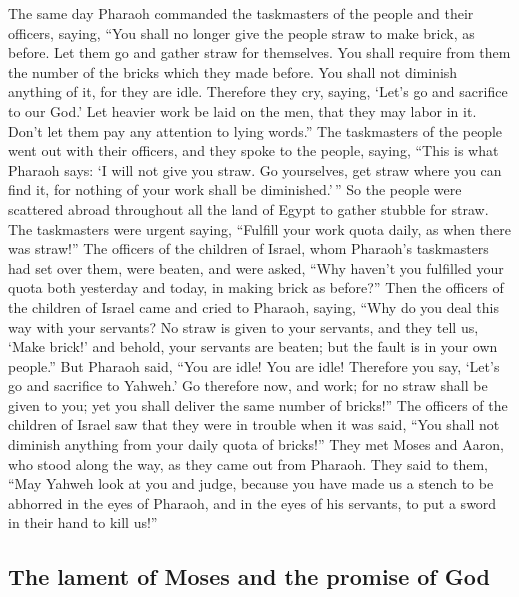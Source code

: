  The same day Pharaoh commanded the taskmasters of the
people and their officers, saying,  ``You shall no longer
give the people straw to make brick, as before. Let them go and gather
straw for themselves.  You shall require from them the
number of the bricks which they made before. You shall not diminish
anything of it, for they are idle. Therefore they cry, saying, `Let's go
and sacrifice to our God.'  Let heavier work be laid on
the men, that they may labor in it. Don't let them pay any attention to
lying words.''  The taskmasters of the people went out
with their officers, and they spoke to the people, saying, ``This is
what Pharaoh says: `I will not give you straw.  Go
yourselves, get straw where you can find it, for nothing of your work
shall be diminished.'\,''  So the people were scattered
abroad throughout all the land of Egypt to gather stubble for straw.
 The taskmasters were urgent saying, ``Fulfill your work
quota daily, as when there was straw!''  The officers of
the children of Israel, whom Pharaoh's taskmasters had set over them,
were beaten, and were asked, ``Why haven't you fulfilled your quota both
yesterday and today, in making brick as before?''  Then
the officers of the children of Israel came and cried to Pharaoh,
saying, ``Why do you deal this way with your servants? 
No straw is given to your servants, and they tell us, `Make brick!' and
behold, your servants are beaten; but the fault is in your own people.''
 But Pharaoh said, ``You are idle! You are idle!
Therefore you say, `Let's go and sacrifice to Yahweh.' 
Go therefore now, and work; for no straw shall be given to you; yet you
shall deliver the same number of bricks!''  The officers
of the children of Israel saw that they were in trouble when it was
said, ``You shall not diminish anything from your daily quota of
bricks!''  They met Moses and Aaron, who stood along the
way, as they came out from Pharaoh.  They said to them,
``May Yahweh look at you and judge, because you have made us a stench to
be abhorred in the eyes of Pharaoh, and in the eyes of his servants, to
put a sword in their hand to kill us!''

\hypertarget{the-lament-of-moses-and-the-promise-of-god}{%
\subsection{The lament of Moses and the promise of
God}\label{the-lament-of-moses-and-the-promise-of-god}}

